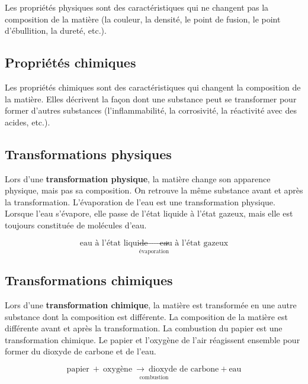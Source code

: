 \documentclass[
  11pt,
  a4paper,
  openany]{book}
\begin{document}
Les propriétés physiques sont des caractéristiques qui ne changent pas la composition de la matière (la couleur, la densité, le point de fusion, le point d'ébullition, la dureté, etc.).

\hypertarget{propriuxe9tuxe9s-chimiques}{%
\subsection{Propriétés chimiques}\label{propriuxe9tuxe9s-chimiques}}

Les propriétés chimiques sont des caractéristiques qui changent la composition de la matière. Elles décrivent la façon dont une substance peut se transformer pour former d'autres substances (l'inflammabilité, la corrosivité, la réactivité avec des acides, etc.).

\hypertarget{transformations-physiques}{%
\subsection{Transformations physiques}\label{transformations-physiques}}

Lors d'une \textbf{transformation physique}, la matière change son apparence physique, mais pas sa composition. On retrouve la même substance avant et après la transformation. L'évaporation de l'eau est une transformation physique. Lorsque l'eau s'évapore, elle passe de l'état liquide à l'état gazeux, mais elle est toujours constituée de molécules d'eau.

\[ \underset{\text{évaporation}}{\text{eau à l'état liquide} \ \longrightarrow \ \text{eau à l'état gazeux}} \]

\hypertarget{transformations-chimiques}{%
\subsection{Transformations chimiques}\label{transformations-chimiques}}

Lors d'une \textbf{transformation chimique}, la matière est transformée en une autre substance dont la composition est différente. La composition de la matière est différente avant et après la transformation. La combustion du papier est une transformation chimique. Le papier et l'oxygène de l'air réagissent ensemble pour former du dioxyde de carbone et de l'eau.

\[ \underset{\text{combustion}}{\text{papier}\ +\ \text{oxygène} \ \longrightarrow \ \text{dioxyde de carbone} + \text{eau}} \]
\end{document}
